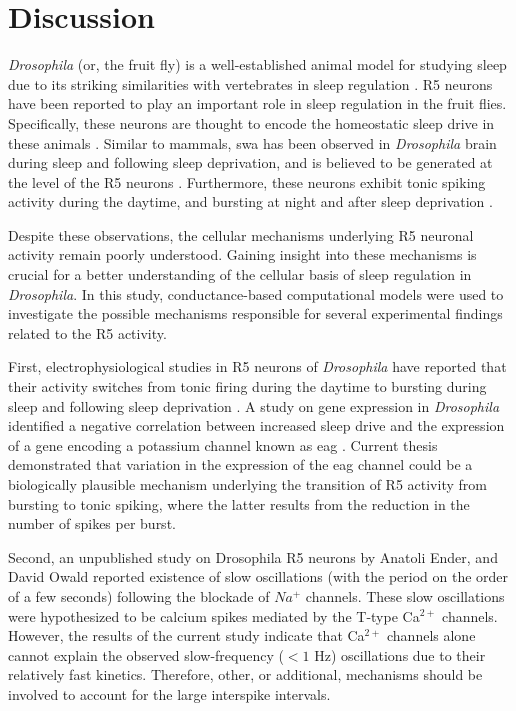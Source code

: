 \documentclass[../main.tex]{subfiles}
\begin{document}
\section{Discussion} \label{sec:discussion}

\textit{Drosophila} (or, the fruit fly) is a well-established animal model for studying sleep due to its striking similarities with vertebrates in sleep regulation \parencite{shaferRegulationDrosophilaSleep2021,andreaniCircadianProgrammingEllipsoid2022}. R5 neurons have been reported to play an important role in sleep regulation in the fruit flies. Specifically, these neurons are thought to encode the homeostatic sleep drive in these animals \parencite{liuSleepDriveEncoded2016}. Similar to mammals,
\gls{swa} has been observed in \textit{Drosophila} brain during sleep and following sleep deprivation, and is believed to be generated at the level of the R5 neurons \parencite{raccugliaNetworkSpecificSynchronizationElectrical2019}. Furthermore, these neurons exhibit tonic spiking activity during the daytime, and bursting at night and after sleep deprivation \parencite{suarez-grimaltNeuralArchitectureSleep2021,liuSleepDriveEncoded2016}. 

Despite these observations, the cellular mechanisms underlying R5 neuronal activity remain poorly understood. Gaining insight into these mechanisms is crucial for a better understanding of the cellular basis of sleep regulation in \textit{Drosophila}.
In this study, conductance-based computational models were used to investigate the possible mechanisms responsible for several experimental findings related to the R5 activity.

First, electrophysiological studies in R5 neurons of \textit{Drosophila} have reported that their activity switches from tonic firing during the daytime to bursting during sleep and following sleep deprivation \parencite{liuSleepDriveEncoded2016,suarez-grimaltNeuralArchitectureSleep2021}. A study on gene expression in \textit{Drosophila} identified a negative correlation between increased sleep drive and the expression of a gene encoding a potassium channel known as \gls{eag} \parencite{doppSinglecellTranscriptomicsReveals2024}. Current thesis demonstrated that variation in the expression of the \gls{eag} channel could be a biologically plausible mechanism underlying the transition of R5 activity from bursting to tonic spiking, where the latter results from the reduction in the number of spikes per burst.

Second, an unpublished study on Drosophila R5 neurons by Anatoli Ender, and David Owald reported existence of slow oscillations (with the period on the order of a few seconds) following the blockade of $Na^+$ channels. These slow oscillations were hypothesized to be calcium spikes mediated by the T-type Ca$^{2+}$ channels. However, the results of the current study indicate that Ca$^{2+}$ channels alone cannot explain the observed slow-frequency ($<1$ Hz) oscillations due to their relatively fast kinetics. Therefore, other, or additional, mechanisms should be involved to account for the large interspike intervals.
\end{document}
